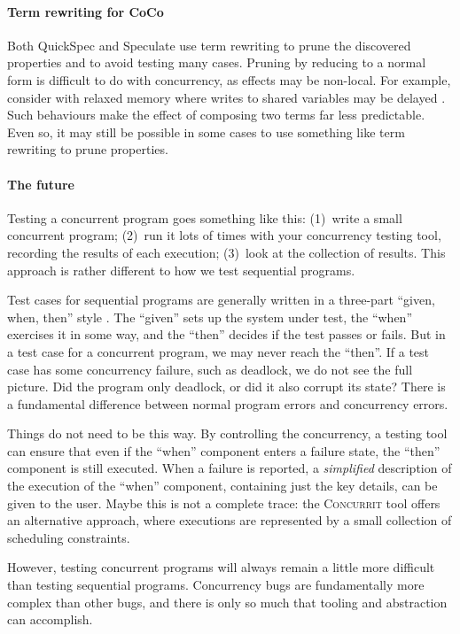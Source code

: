\paragraph{Term rewriting for CoCo}
Both QuickSpec \parencite{smallbone2017} and Speculate \parencite{braquehais2017}
use term rewriting to prune the discovered properties and to avoid
testing many cases.  Pruning by reducing to a normal form is difficult
to do with concurrency, as effects may be non-local.  For example,
consider with relaxed memory where writes to shared variables may be
delayed \parencite{zhang2015}.  Such behaviours make the effect of composing
two terms far less predictable.  Even so, it may still be possible in
some cases to use something like term rewriting to prune properties.

\paragraph{The future}
Testing a concurrent program goes something like this: (1)~write a
small concurrent program; (2)~run it lots of times with your
concurrency testing tool, recording the results of each execution;
(3)~look at the collection of results.  This approach is rather
different to how we test sequential programs.

Test cases for sequential programs are generally written in a
three-part ``given, when, then'' style \parencite{fowler2013}.  The
``given'' sets up the system under test, the ``when'' exercises it in
some way, and the ``then'' decides if the test passes or fails.  But
in a test case for a concurrent program, we may never reach the
``then''.  If a test case has some concurrency failure, such as
deadlock, we do not see the full picture.  Did the program only
deadlock, or did it also corrupt its state?  There is a fundamental
difference between normal program errors and concurrency errors.

Things do not need to be this way.  By controlling the concurrency, a
testing tool can ensure that even if the ``when'' component enters a
failure state, the ``then'' component is still executed.  When a
failure is reported, a \emph{simplified} description of the execution
of the ``when'' component, containing just the key details, can be
given to the user.  Maybe this is not a complete trace: the
\textsc{Concurrit} \parencite{elmas2013} tool offers an alternative
approach, where executions are represented by a small collection of
scheduling constraints.

However, testing concurrent programs will always remain a little more
difficult than testing sequential programs.  Concurrency bugs are
fundamentally more complex than other bugs, and there is only so much
that tooling and abstraction can accomplish.
